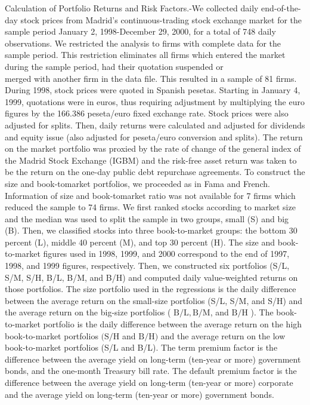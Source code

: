 \documentclass[10pt]{article}
\begin{document}
Calculation of Portfolio Returns and Risk Factors.-We collected daily end-of-the-day stock prices from Madrid's continuous-trading stock exchange market for the sample period January 2, 1998-December 29, 2000, for a total of 748 daily observations. We restricted the analysis to firms with complete data for the sample period. This restriction eliminates all firms which entered the market during the sample period, had their quotation suspended or\\
merged with another firm in the data file. This resulted in a sample of 81 firms. During 1998, stock prices were quoted in Spanish pesetas. Starting in January 4, 1999, quotations were in euros, thus requiring adjustment by multiplying the euro figures by the 166.386 peseta/euro fixed exchange rate. Stock prices were also adjusted for splits. Then, daily returns were calculated and adjusted for dividends and equity issue (also adjusted for peseta/euro conversion and splits). The return on the market portfolio was proxied by the rate of change of the general index of the Madrid Stock Exchange (IGBM) and the risk-free asset return was taken to be the return on the one-day public debt repurchase agreements. To construct the size and book-tomarket portfolios, we proceeded as in Fama and French. Information of size and book-tomarket ratio was not available for 7 firms which reduced the sample to 74 firms. We first ranked stocks according to market size and the median was used to split the sample in two groups, small (S) and big (B). Then, we classified stocks into three book-to-market groups: the bottom 30 percent (L), middle 40 percent (M), and top 30 percent (H). The size and book-to-market figures used in 1998, 1999, and 2000 correspond to the end of 1997, 1998, and 1999 figures, respectively. Then, we constructed six portfolios (S/L, S/M, S/H, B/L, B/M, and B/H) and computed daily value-weighted returns on those portfolios. The size portfolio used in the regressions is the daily difference between the average return on the small-size portfolios (S/L, S/M, and S/H) and the average return on the big-size portfolios ( $\mathrm{B} / \mathrm{L}, \mathrm{B} / \mathrm{M}$, and $\mathrm{B} / \mathrm{H}$ ). The book-to-market portfolio is the daily difference between the average return on the high book-to-market portfolios $(\mathrm{S} / \mathrm{H}$ and $\mathrm{B} / \mathrm{H})$ and the average return on the low book-to-market portfolios (S/L and B/L). The term premium factor is the difference between the average yield on long-term (ten-year or more) government bonds, and the one-month Treasury bill rate. The default premium factor is the difference between the average yield on long-term (ten-year or more) corporate and the average yield on long-term (ten-year or more) government bonds.
\end{document}
